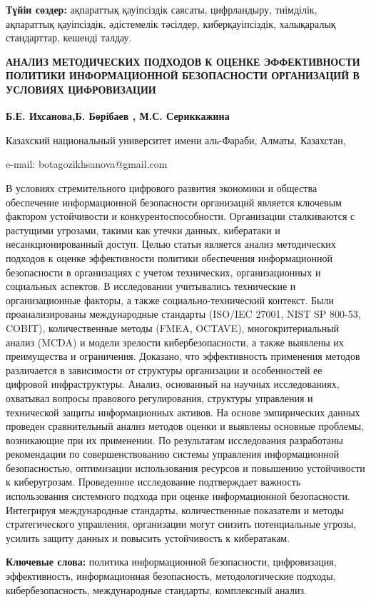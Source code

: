 {\bfseries Түйін сөздер:} ақпараттық қауіпсіздік саясаты, цифрландыру,
тиімділік, ақпараттық қауіпсіздік, әдістемелік тәсілдер,
киберқауіпсіздік, халықаралық стандарттар, кешенді талдау.

{\bfseries АНАЛИЗ МЕТОДИЧЕСКИХ ПОДХОДОВ К ОЦЕНКЕ ЭФФЕКТИВНОСТИ ПОЛИТИКИ
ИНФОРМАЦИОННОЙ БЕЗОПАСНОСТИ ОРГАНИЗАЦИЙ В УСЛОВИЯХ ЦИФРОВИЗАЦИИ}

{\bfseries Б.Е. Ихсанова\textsuperscript{\envelope },Б. Бөрібаев , М.С. Сериккажина}

Казахский национальный университет имени аль-Фараби, Алматы, Казахстан,

e-mail: botagozikhsanova@gmail.com

В условиях стремительного цифрового развития экономики и общества
обеспечение информационной безопасности организаций является ключевым
фактором устойчивости и конкурентоспособности. Организации сталкиваются
с растущими угрозами, такими как утечки данных, кибератаки и
несанкционированный доступ. Целью статьи является анализ методических
подходов к оценке эффективности политики обеспечения информационной
безопасности в организациях с учетом технических, организационных и
социальных аспектов. В исследовании учитывались технические и
организационные факторы, а также социально-технический контекст. Были
проанализированы международные стандарты (ISO/IEC 27001, NIST SP 800-53,
COBIT), количественные методы (FMEA, OCTAVE), многокритериальный анализ
(MCDA) и модели зрелости кибербезопасности, а также выявлены их
преимущества и ограничения. Доказано, что эффективность применения
методов различается в зависимости от структуры организации и
особенностей ее цифровой инфраструктуры. Анализ, основанный на научных
исследованиях, охватывал вопросы правового регулирования, структуры
управления и технической защиты информационных активов. На основе
эмпирических данных проведен сравнительный анализ методов оценки и
выявлены основные проблемы, возникающие при их применении. По
результатам исследования разработаны рекомендации по совершенствованию
системы управления информационной безопасностью, оптимизации
использования ресурсов и повышению устойчивости к киберугрозам.
Проведенное исследование подтверждает важность использования системного
подхода при оценке информационной безопасности. Интегрируя международные
стандарты, количественные показатели и методы стратегического
управления, организации могут снизить потенциальные угрозы, усилить
защиту данных и повысить устойчивость к кибератакам.

{\bfseries Ключевые слова:} политика информационной безопасности,
цифровизация, эффективность, информационная безопасность,
методологические подходы, кибербезопасность, международные стандарты,
комплексный анализ.

